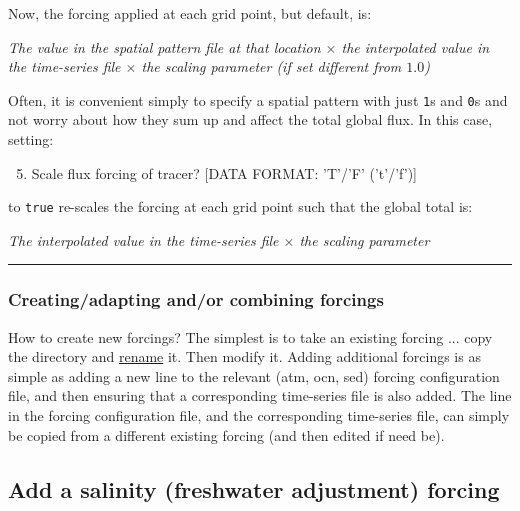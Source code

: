 \vspace{1mm}
Now, the forcing applied at each grid point, but default, is:

\vspace{1mm}
\textit{The value in the spatial pattern file at that location \(\times\) the interpolated value in the time-series file \(\times\) the scaling parameter (if set different from \(1.0\))}
\vspace{1mm}

Often, it is convenient simply to specify a spatial pattern with just \texttt{1}s and \texttt{0}s and not worry about how they sum up and affect the total global flux. In this case, setting:
\vspace{1mm}
\begin{enumerate}[noitemsep]
\setlength{\itemindent}{-0.0in}
\setcounter{enumi}{4}
\item Scale flux forcing of tracer? [DATA FORMAT: 'T'/'F' ('t'/'f')]
\end{enumerate}
to \texttt{true} re-scales the forcing at each grid point such that the global total is:

\vspace{1mm}
\textit{The interpolated value in the time-series file \(\times\) the scaling parameter}
\vspace{1mm}

\vspace{1mm}
\noindent\rule{4cm}{0.5pt}
\vspace{2mm}

\subsubsection*{Creating/adapting and/or combining forcings}

\vspace{1mm}

How to create new forcings? The simplest is to take an existing forcing ... copy the directory and \uline{rename} it. Then modify it. Adding additional forcings is as simple as adding a new line to the relevant (atm, ocn, sed) forcing configuration file, and then ensuring that a corresponding time-series file is also added. The line in the forcing configuration file, and the corresponding time-series file, can simply be copied from a different existing forcing (and then edited if need be). 

%
\newpage
\subsection*{Add a salinity (freshwater adjustment) forcing}
\vspace{1mm}

